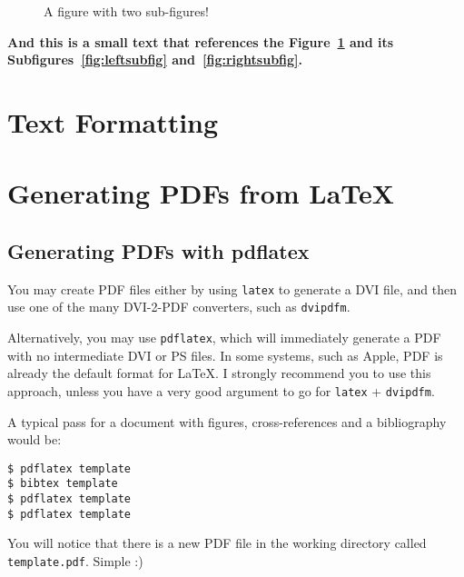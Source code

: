 \lipsum[1-3]

\begin{figure}[htbp]
  \centering
  \caption{A figure with two sub-figures!}
  \label{fig:fig2subfig}
\end{figure}

\textbf{And this is a small text that references the Figure~\ref{fig:fig2subfig} and its Subfigures~\ref{fig:leftsubfig} and~\ref{fig:rightsubfig}.}

\lipsum[1-3]


\section{Text Formatting} %
\label{sec:text_formatting}



\section{Generating PDFs from \LaTeX} %
\label{sec:generating_pdfs_from_latex}

\subsection{Generating PDFs with pdflatex} %
\label{ssec:generating_pdfs_with_pdflatex}

You may create PDF files either by using \verb!latex! to generate a DVI file, and then use one of the many DVI-2-PDF converters, such as \verb!dvipdfm!.

Alternatively, you may use \verb!pdflatex!, which will immediately generate a PDF with no intermediate DVI or PS files. In some systems, such as Apple, PDF is already the default format for \LaTeX. I strongly recommend you to use this approach, unless you have a very good argument to go for \verb!latex! + \verb!dvipdfm!.

A typical pass for a document with figures, cross-references and a bibliography would be:
\begin{verbatim}
$ pdflatex template
$ bibtex template
$ pdflatex template
$ pdflatex template
\end{verbatim}
You will notice that there is a new PDF file in the working directory called \verb!template.pdf!. Simple :)

